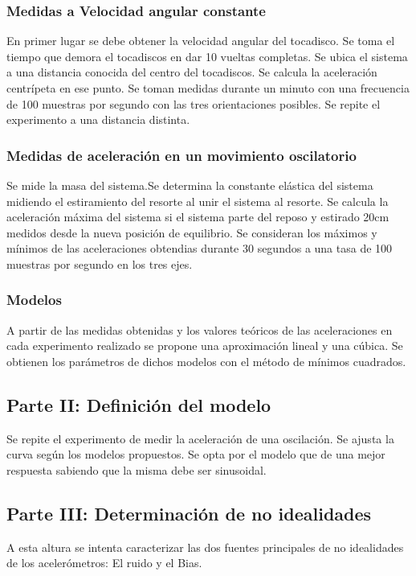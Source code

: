 \documentclass[spanish,12pt,a4paper,titlepage]{report}
\begin{document}
\subsubsection*{Medidas a Velocidad angular constante}
En primer lugar se debe obtener la velocidad angular del tocadisco. Se toma el tiempo que demora el tocadiscos en dar 10 vueltas completas. Se ubica el sistema a una distancia conocida del centro del tocadiscos. Se calcula la aceleración centrípeta en ese punto. Se toman medidas durante un minuto con una frecuencia de 100 muestras por segundo con las tres orientaciones posibles. 
Se repite el experimento a una distancia distinta. 

\subsubsection*{Medidas de aceleración en un movimiento oscilatorio}
Se mide la masa del sistema.Se determina la constante elástica del sistema midiendo el estiramiento del resorte al unir el sistema al resorte. Se calcula la aceleración máxima del sistema si el sistema parte del reposo y estirado 20cm medidos desde la nueva posición de equilibrio. Se consideran los máximos y mínimos de las aceleraciones obtendias durante 30 segundos a una tasa de 100 muestras por segundo en los tres ejes.

\subsubsection*{Modelos}
A partir de las medidas obtenidas y los valores teóricos de las aceleraciones en cada experimento realizado se propone una aproximación lineal y una cúbica. Se obtienen los parámetros de dichos modelos con el método de mínimos cuadrados.

\subsection{Parte II: Definición del modelo}
Se repite el experimento de medir la aceleración de una oscilación. Se ajusta la curva según los modelos propuestos. Se opta por el modelo que de una mejor respuesta sabiendo que la misma debe ser sinusoidal.

\subsection{Parte III: Determinación de no idealidades}
A esta altura se intenta caracterizar las dos fuentes principales de no idealidades de los acelerómetros: El ruido y el Bias.
\end{document}
